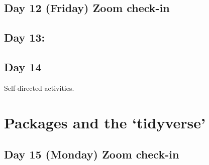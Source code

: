 \documentclass[]{book}
\newenvironment{Shaded}{\begin{snugshade}}{\end{snugshade}}
\newcommand{\CommentTok}[1]{\textcolor[rgb]{0.56,0.35,0.01}{\textit{#1}}}
\newcommand{\KeywordTok}[1]{\textcolor[rgb]{0.13,0.29,0.53}{\textbf{#1}}}
\newcommand{\NormalTok}[1]{#1}
\newcommand{\OperatorTok}[1]{\textcolor[rgb]{0.81,0.36,0.00}{\textbf{#1}}}
\newcommand{\StringTok}[1]{\textcolor[rgb]{0.31,0.60,0.02}{#1}}
\begin{document}
\begin{itemize}
\begin{Shaded}
\end{Shaded}
\end{itemize}

\hypertarget{day-12-friday-zoom-check-in}{%
\section{Day 12 (Friday) Zoom check-in}\label{day-12-friday-zoom-check-in}}

\hypertarget{day-13}{%
\section{Day 13:}\label{day-13}}

\hypertarget{day-14}{%
\section{Day 14}\label{day-14}}

Self-directed activities.

\hypertarget{three}{%
\chapter{Packages and the `tidyverse'}\label{three}}

\hypertarget{day-15-monday-zoom-check-in}{%
\section{Day 15 (Monday) Zoom check-in}\label{day-15-monday-zoom-check-in}}
\end{document}
